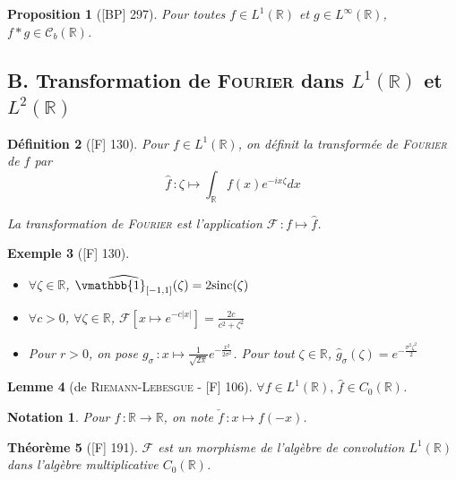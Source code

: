\documentclass[10pt, a4paper, parskip=full, twoside, twocolumn]{report}
\newtheorem{definition}{Définition}
\newtheorem{theorem}[definition]{Théorème}
\newtheorem{proposition}[definition]{Proposition}
\newtheorem{lemma}[definition]{Lemme}
\newtheorem{example}[definition]{Exemple}
\newtheorem*{notation*}{Notation}
\newcommand{\IR}{\mathbb{R}}
\begin{document}
\begin{proposition}[\textnormal{[BP] 297}]
	Pour toutes $f\in L^1(\IR)$ et $g\in L^{\infty}(\IR)$, $f*g\in \mathcal{C}_b(\IR)$.
\end{proposition}

\subsection*{B. Transformation de \textsc{Fourier} dans $L^1(\IR)$ et $L^2(\IR)$}

\begin{definition}[\textnormal{[F] 130}]
	Pour $f\in L^1(\IR)$, on définit la \emph{transformée de \textsc{Fourier} de $f$} par 
	$$\hat{f} \,\colon \zeta \mapsto \int_{\IR} f(x)e^{-ix\zeta}dx$$

	La \emph{transformation de \textsc{Fourier}} est l'application $\mathcal{F}\,\colon f\mapsto \hat{f}$.
\end{definition}

\begin{example}[\textnormal{[F] 130}]
	\begin{itemize}
		\item $\forall \zeta\in\IR$, $\widehat{\vmathbb{1}_{[-1,1]}}(\zeta) = 2\textnormal{sinc}(\zeta)$
		\item $\forall c >0$, $\forall \zeta\in\IR$, $\mathcal{F}[x\mapsto e^{-c\lvert x\rvert}] = \frac{2c}{c^2 + \zeta^2}$
		\item Pour $r>0$, on pose $g_{\sigma}\,\colon x\mapsto\frac{1}{\sqrt{2\pi}}e^{-\frac{x^2}{2\sigma^2}}$. Pour tout $\zeta\in\IR$, $\hat{g}_{\sigma}(\zeta) = e^{-\frac{\sigma^2\zeta^2}{2}}$
	\end{itemize}
\end{example}

\begin{lemma}[de \textsc{Riemann-Lebesgue} - \textnormal{[F] 106}]
	$\forall f\in L^1(\IR),\, \hat{f}\in C_0(\IR)$.
\end{lemma}

\begin{notation*}
	Pour $f\,\colon\IR\to\IR$, on note $\check{f}\,\colon x\mapsto f(-x)$.
\end{notation*}

\begin{theorem}[\textnormal{[F] 191}]
	$\mathcal{F}$ est un morphisme de l'algèbre de convolution $L^1(\IR)$ dans l'algèbre multiplicative $C_0(\IR)$.
\end{theorem}
\end{document}
